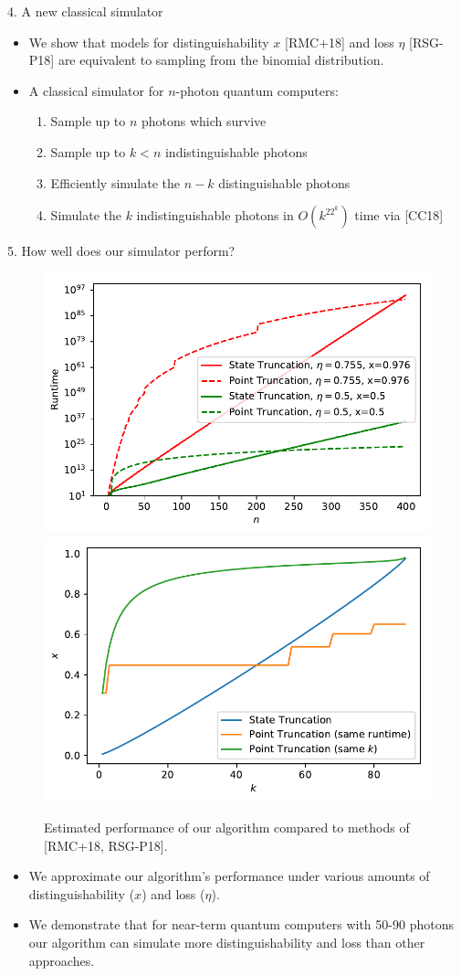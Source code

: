 \documentclass[]{templates/poster}
\begin{document}
\begin{frame}{}
\begin{columns}[t]
  \begin{column}{0.422\linewidth}
  
  \begin{block}{\Large 4. A new classical simulator}
  \begin{itemize}
  \item We show that models for distinguishability $x$ [RMC+18] and loss $\eta$ [RSG-P18] are equivalent to sampling from the binomial distribution.
  \item A classical simulator for $n$-photon quantum computers:
  \begin{enumerate}
  \item Sample up to $n$ photons which survive
  \item Sample up to $k<n$ indistinguishable photons
  \item Efficiently simulate the $n-k$ distinguishable photons
  \item Simulate the $k$ indistinguishable photons in $O(k^22^k)$ time via [CC18]
  \end{enumerate}
  \end{itemize}
  \end{block}
  
  \begin{block}{\Large 5. How well does our simulator perform?}
  \begin{center}
  \begin{figure}
  \includegraphics[width=0.45\linewidth]{runtime}
  \hfill
  \includegraphics[width=0.45\linewidth]{max_x_fixed_n_90}
  \caption{\label{fig:performance} Estimated performance of our algorithm compared to methods of [RMC+18, RSG-P18].}
  \end{figure}
  \end{center}
  \begin{itemize}
  \item We approximate our algorithm's performance under various amounts of distinguishability ($x$) and loss ($\eta$).
  \item We demonstrate that for near-term quantum computers with 50-90 photons our algorithm can simulate more distinguishability and loss than other approaches.
  \end{itemize}
  

\end{block}
\end{column}
\end{columns}
\end{frame}
\end{document}
